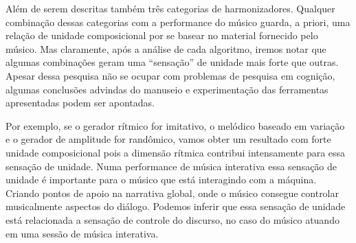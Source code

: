 \documentclass[draft]{ppgmus}
\begin{document}
Além de serem descritas também três categorias de harmonizadores.
Qualquer combinação dessas categorias com a performance do músico guarda, a priori,  
uma relação de unidade composicional por se basear no material fornecido pelo músico.
Mas claramente, após a análise de cada algoritmo, iremos notar que algumas combinações 
geram uma ``sensação'' de unidade mais forte que outras. Apesar dessa pesquisa
não se ocupar com problemas de pesquisa em cognição, algumas conclusões advindas
do manuseio e experimentação das ferramentas apresentadas podem ser apontadas.

Por exemplo, se o gerador rítmico for imitativo, o melódico baseado em
variação e o gerador de amplitude for randômico, vamos obter um resultado
com forte unidade composicional pois a dimensão rítmica contribui intensamente
para essa sensação de unidade. Numa performance de música interativa essa sensação
de unidade é importante para o músico que está interagindo com a máquina. Criando
pontos de apoio na narrativa global, onde o músico consegue controlar musicalmente 
aspectos do diálogo. Podemos inferir que essa sensação de unidade está relacionada
a sensação de controle do discurso, no caso do músico atuando em uma sessão de música
interativa.

% 
% 

% 
% 
% 
% 
% 
% 
% 
% 
\end{document}
